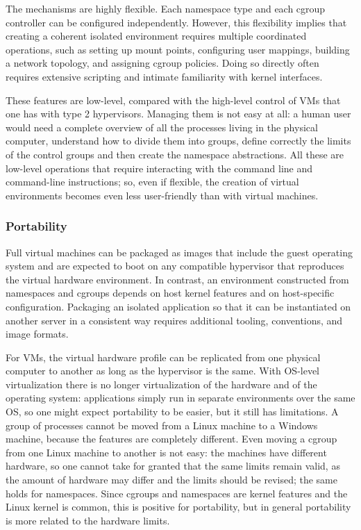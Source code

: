The mechanisms are highly flexible. Each namespace type and each cgroup controller can be configured independently. However, this flexibility implies that creating a coherent isolated environment requires multiple coordinated operations, such as setting up mount points, configuring user mappings, building a network topology, and assigning cgroup policies. Doing so directly often requires extensive scripting and intimate familiarity with kernel interfaces.

These features are low-level, compared with the high-level control of VMs that one has with type 2 hypervisors. Managing them is not easy at all: a human user would need a complete overview of all the processes living in the physical computer, understand how to divide them into groups, define correctly the limits of the control groups and then create the namespace abstractions. All these are low-level operations that require interacting with the command line and command-line instructions; so, even if flexible, the creation of virtual environments becomes even less user-friendly than with virtual machines.

\subsubsection*{Portability}

Full virtual machines can be packaged as images that include the guest operating system and are expected to boot on any compatible hypervisor that reproduces the virtual hardware environment. In contrast, an environment constructed from namespaces and cgroups depends on host kernel features and on host-specific configuration. Packaging an isolated application so that it can be instantiated on another server in a consistent way requires additional tooling, conventions, and image formats.

For VMs, the virtual hardware profile can be replicated from one physical computer to another as long as the hypervisor is the same. With OS-level virtualization there is no longer virtualization of the hardware and of the operating system: applications simply run in separate environments over the same OS, so one might expect portability to be easier, but it still has limitations. A group of processes cannot be moved from a Linux machine to a Windows machine, because the features are completely different. Even moving a cgroup from one Linux machine to another is not easy: the machines have different hardware, so one cannot take for granted that the same limits remain valid, as the amount of hardware may differ and the limits should be revised; the same holds for namespaces. Since cgroups and namespaces are kernel features and the Linux kernel is common, this is positive for portability, but in general portability is more related to the hardware limits.

